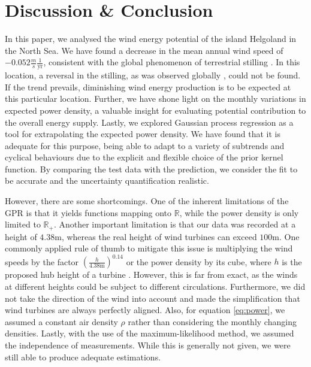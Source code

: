 \documentclass{article}
\theoremstyle{plain}
\theoremstyle{definition}
\theoremstyle{remark}
\newcommand{\R}{\mathbb{R}}
\begin{document}
\section{Discussion \& Conclusion}\label{sec:conclusion}
In this paper, we analysed the wind energy potential of the island Helgoland in the North Sea.  We
have found a decrease in the mean annual wind speed of $-0.052 \frac{m}{s}  \frac{1}{\mathrm{yr}}$,
consistent with the global phenomenon of terrestrial stilling \cite{stilling}. In this location, a
reversal in the stilling, as  was observed globally \cite{stilling-reversal}, could not be found. If
the trend prevails, diminishing wind energy production is to be expected at this particular
location.  Further, we have shone light on the monthly variations in expected power density, a
valuable insight for evaluating potential contribution to the overall energy supply.  Lastly, we
explored Gaussian process regression as a tool for extrapolating the expected power density.  We
have found that it is adequate for this purpose, being able to adapt to a variety of subtrends and
cyclical behaviours due to the explicit and flexible choice of the prior kernel function. By
comparing the test data with the prediction, we consider the fit to be accurate and the uncertainty
quantification realistic.

However, there are some shortcomings. One of the inherent limitations of the GPR is that it yields
functions mapping onto $\R$, while the power density is only limited to $\R_+$.
Another important limitation is that our data was recorded at a height of $4.38 \mathrm{m}$, whereas
the real height of wind turbines can exceed $100 \mathrm{m}$. One commonly applied rule of thumb to
mitigate this issue is multiplying the wind speeds by the factor $\left(\frac{h}{4.38 \mathrm{m}}
\right)^{0.14}$ or the power density by its cube, where $h$ is the  proposed hub height of a turbine
\citep{statanalysis}. However, this is far from exact, as the winds at different heights could be
subject to different circulations.  Furthermore, we did not take the direction of the wind into
account and made the simplification that wind turbines are always perfectly aligned.  Also, for
equation \eqref{eq:power}, we assumed a constant air density $\rho$ rather than considering the monthly
changing densities.  Lastly, with the use of the maximum-likelihood method, we assumed the
independence of measurements. While this is generally not given, we were still able to produce
adequate estimations.
\end{document}
